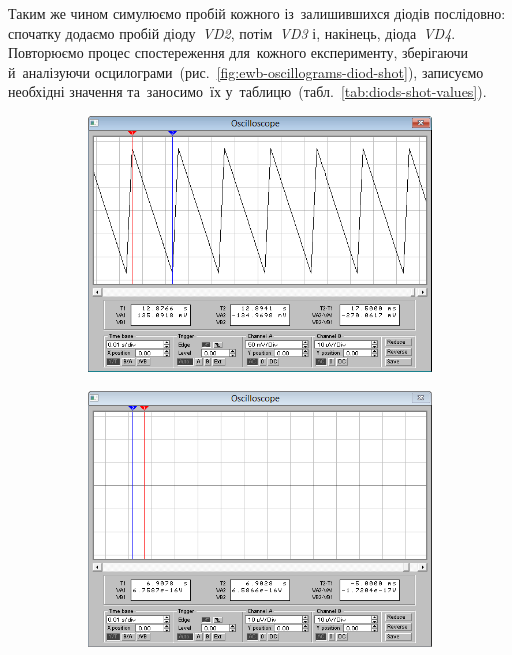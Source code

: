 \documentclass[
	a4paper,
	oneside,
	BCOR = 10mm,
	DIV = 12,
	12pt,
	headings = normal,
]{scrartcl}
\newcommand{\schel}[1]{\textit{#1}}
\begin{document}
			Таким же чином симулюємо пробій кожного із~залишившихся діодів послідовно: спочатку додаємо пробій діоду~\schel{VD2}, потім~\schel{VD3} і, накінець, діода~\schel{VD4}. Повторюємо процес спостереження для~кожного експерименту, зберігаючи й~аналізуючи осцилограми~(рис.~\ref{fig:ewb-oscillograms-diod-shot}), записуємо необхідні значення та~заносимо~їх у~таблицю~(табл.~\ref{tab:diods-shot-values}). 

			\begin{figure}[!htbp]
				\centering
				\begin{subfigure}[t]{0.5\columnwidth}
					\centering
					\includegraphics[height = 8\baselineskip]{./assets/y03s02-pcdiag-lab-01-p02-01b.png}
					\caption{}
					\label{subfig:ewb-scope-02-01}
				\end{subfigure}%
				\begin{subfigure}[t]{0.5\columnwidth}
					\centering
					\includegraphics[height = 8\baselineskip]{./assets/y03s02-pcdiag-lab-01-p02-02b.png}

\end{subfigure}
\end{figure}
\end{document}
